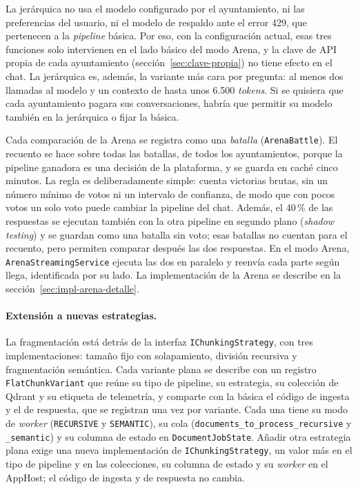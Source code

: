 La jerárquica no usa el modelo configurado por el ayuntamiento, ni las preferencias del usuario, ni el modelo de respaldo ante el error 429, que pertenecen a la \emph{pipeline} básica. Por eso, con la configuración actual, esas tres funciones solo intervienen en el lado básico del modo Arena, y la clave de API propia de cada ayuntamiento (sección~\ref{sec:clave-propia}) no tiene efecto en el chat. La jerárquica es, además, la variante más cara por pregunta: al menos dos llamadas al modelo y un contexto de hasta unos 6.500 \emph{tokens}. Si se quisiera que cada ayuntamiento pagara sus conversaciones, habría que permitir su modelo también en la jerárquica o fijar la básica.

Cada comparación de la Arena se registra como una \emph{batalla} (\texttt{ArenaBattle}). El recuento se hace sobre todas las batallas, de todos los ayuntamientos, porque la pipeline ganadora es una decisión de la plataforma, y se guarda en caché cinco minutos. La regla es deliberadamente simple: cuenta victorias brutas, sin un número mínimo de votos ni un intervalo de confianza, de modo que con pocos votos un solo voto puede cambiar la pipeline del chat. Además, el 40\,\% de las respuestas se ejecutan también con la otra pipeline en segundo plano (\emph{shadow testing}) y se guardan como una batalla sin voto; esas batallas no cuentan para el recuento, pero permiten comparar después las dos respuestas. En el modo Arena, \texttt{ArenaStreamingService} ejecuta las dos en paralelo y reenvía cada parte según llega, identificada por su lado. La implementación de la Arena se describe en la sección~\ref{sec:impl-arena-detalle}.

\paragraph{Extensión a nuevas estrategias.} La fragmentación está detrás de la interfaz \texttt{IChunkingStrategy}, con tres implementaciones: tamaño fijo con solapamiento, división recursiva y fragmentación semántica. Cada variante plana se describe con un registro \texttt{FlatChunkVariant} que reúne su tipo de pipeline, su estrategia, su colección de Qdrant y su etiqueta de telemetría, y comparte con la básica el código de ingesta y el de respuesta, que se registran una vez por variante. Cada una tiene su modo de \emph{worker} (\texttt{RECURSIVE} y \texttt{SEMANTIC}), su cola (\texttt{documents\_to\_\allowbreak process\_recursive} y \texttt{\_semantic}) y su columna de estado en \texttt{DocumentJobState}. Añadir otra estrategia plana exige una nueva implementación de \texttt{IChunkingStrategy}, un valor más en el tipo de pipeline y en las colecciones, su columna de estado y su \emph{worker} en el AppHost; el código de ingesta y de respuesta no cambia.

